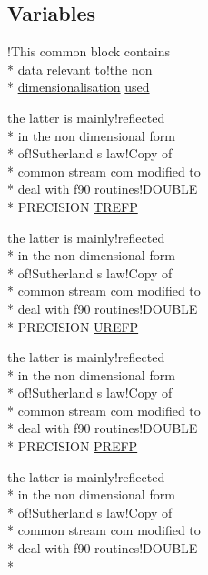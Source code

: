 \subsection*{Variables}
\begin{DoxyCompactItemize}
\item 
!This common block contains \\*
data relevant to!the non \\*
\hyperlink{ioplasma_8com_a400563a4c7d85c3c04db2d7e198c44a3}{dimensionalisation} \hyperlink{streamplasma_8com_ae33ecc71599b4338146f31d68e60c328}{used}
\item 
the latter is mainly!reflected \\*
in the non dimensional form \\*
of!\-Sutherland s law!\-Copy of \\*
common stream com modified to \\*
deal with f90 routines!\-D\-O\-U\-B\-L\-E \\*
P\-R\-E\-C\-I\-S\-I\-O\-N \hyperlink{streamplasma_8com_a8eec3465503eea308bd475421a829fb7}{T\-R\-E\-F\-P}
\item 
the latter is mainly!reflected \\*
in the non dimensional form \\*
of!\-Sutherland s law!\-Copy of \\*
common stream com modified to \\*
deal with f90 routines!\-D\-O\-U\-B\-L\-E \\*
P\-R\-E\-C\-I\-S\-I\-O\-N \hyperlink{streamplasma_8com_aefb5084f5d13055365d34bc8560753b3}{U\-R\-E\-F\-P}
\item 
the latter is mainly!reflected \\*
in the non dimensional form \\*
of!\-Sutherland s law!\-Copy of \\*
common stream com modified to \\*
deal with f90 routines!\-D\-O\-U\-B\-L\-E \\*
P\-R\-E\-C\-I\-S\-I\-O\-N \hyperlink{streamplasma_8com_aae05c29a1ba25a18ea74249350612095}{P\-R\-E\-F\-P}
\item 
the latter is mainly!reflected \\*
in the non dimensional form \\*
of!\-Sutherland s law!\-Copy of \\*
common stream com modified to \\*
deal with f90 routines!\-D\-O\-U\-B\-L\-E \\*

\end{DoxyCompactItemize}
